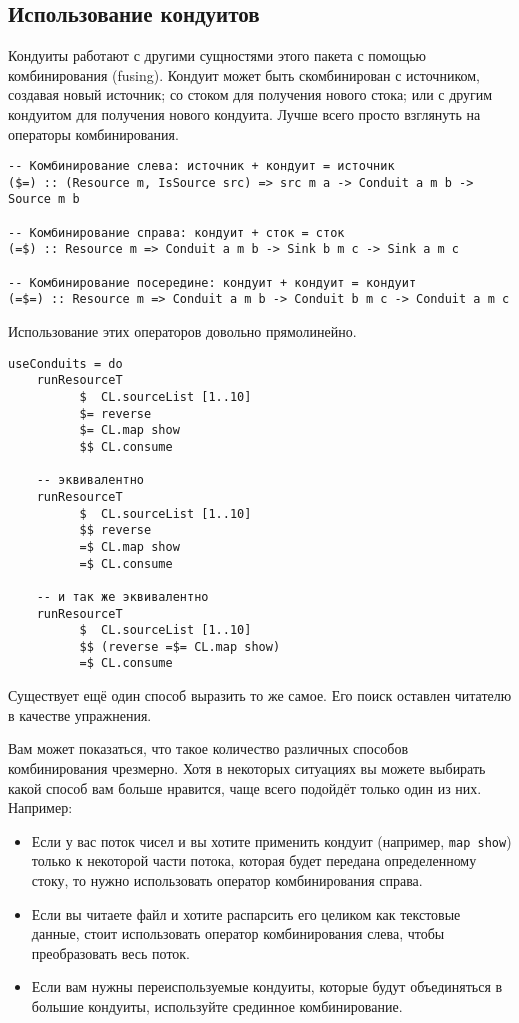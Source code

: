 \subsection{Использование кондуитов}
Кондуиты работают с другими сущностями этого пакета с помощью комбинирования (fusing).
Кондуит может быть скомбинирован с источником, создавая новый источник;
со стоком для получения нового стока; или с другим кондуитом для получения
нового кондуита. Лучше всего просто взглянуть на операторы комбинирования.
\begin{lstlisting}
-- Комбинирование слева: источник + кондуит = источник
($=) :: (Resource m, IsSource src) => src m a -> Conduit a m b -> Source m b

-- Комбинирование справа: кондуит + сток = сток
(=$) :: Resource m => Conduit a m b -> Sink b m c -> Sink a m c

-- Комбинирование посередине: кондуит + кондуит = кондуит
(=$=) :: Resource m => Conduit a m b -> Conduit b m c -> Conduit a m c
\end{lstlisting}
Использование этих операторов довольно прямолинейно.
\begin{lstlisting}
useConduits = do
    runResourceT
          $  CL.sourceList [1..10]
          $= reverse
          $= CL.map show
          $$ CL.consume

    -- эквивалентно
    runResourceT
          $  CL.sourceList [1..10]
          $$ reverse
          =$ CL.map show
          =$ CL.consume

    -- и так же эквивалентно
    runResourceT
          $  CL.sourceList [1..10]
          $$ (reverse =$= CL.map show)
          =$ CL.consume
\end{lstlisting}
Существует ещё один способ выразить то же самое. Его поиск оставлен читателю
 в качестве упражнения.

Вам может показаться, что такое количество различных способов комбинирования
чрезмерно. Хотя в некоторых ситуациях вы можете выбирать какой способ вам больше нравится,
чаще всего подойдёт только один из них. Например:

\begin{itemize}
\item Если у вас поток чисел и вы хотите применить кондуит (например,
\lstinline'map show') только к некоторой части потока, которая будет передана
определенному стоку, то нужно использовать оператор комбинирования справа.
\item Если вы читаете файл и хотите распарсить его целиком как текстовые данные,
стоит использовать оператор комбинирования слева, чтобы преобразовать весь поток.
\item Если вам нужны переиспользуемые кондуиты, которые будут объединяться в
большие кондуиты, используйте срединное комбинирование.
\end{itemize}

